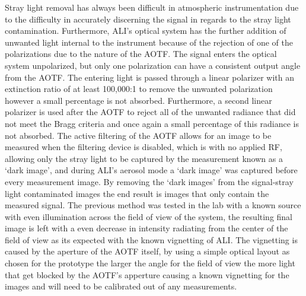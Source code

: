 Stray light removal has always been difficult in atmospheric instrumentation due to the difficulty in accurately discerning the signal in regards to the stray light contamination. Furthermore, ALI's optical system has the further addition of unwanted light internal to the instrument because of the rejection of one of the polarizations due to the nature of the AOTF. The signal enters the optical system unpolarized, but only one polarization can have a consistent output angle from the AOTF. The entering light is passed through a linear polarizer with an extinction ratio of at least 100,000:1 to remove the unwanted polarization however a small percentage is not absorbed. Furthermore, a second linear polarizer is used after the AOTF to reject all of the unwanted radiance that did not meet the Bragg criteria and once again a small percentage of this radiance is not absorbed. The active filtering of the AOTF allows for an image to be measured when the filtering device is disabled, which is with no applied RF, allowing only the stray light to be captured by the measurement known as a `dark image', and during ALI's aerosol mode a `dark image' was captured before every measurement image. By removing the `dark images' from the signal-stray light contaminated images the end result is images that only contain the measured signal. The previous method was tested in the lab with a known source with even illumination across the field of view of the system, the resulting final image is left with a even decrease in intensity radiating from the center of the field of view as its expected with the known vignetting of ALI. The vignetting is caused by the aperture of the AOTF itself, by using a simple optical layout as chosen for the prototype the larger the angle for the field of view the more light that get blocked by the AOTF's apperture causing a known vignetting for the images and will need to be calibrated out of any measurements.

